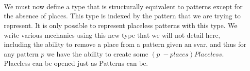 {\begin{code}
\AgdaSpace{}%
\AgdaSymbol{(}\AgdaSpace{}%
\AgdaSpace{}%
\AgdaSpace{}%
\AgdaSymbol{)}\AgdaSpace{}%
\AgdaSymbol{=}\AgdaSpace{}%
\AgdaSymbol{(}\AgdaSpace{}%
\AgdaSpace{}%
\AgdaSymbol{)}\AgdaSpace{}%
\AgdaSpace{}%
\AgdaSpace{}%
\AgdaSpace{}%
\AgdaSpace{}%
\AgdaOperator{\AgdaInductiveConstructor{[}}\AgdaSpace{}%
\AgdaSpace{}%
\AgdaOperator{\AgdaFunction{++}}\AgdaSpace{}%
\AgdaSpace{}%
\AgdaOperator{\AgdaInductiveConstructor{]}}\<%
\\
\>[0]\AgdaSpace{}%
\AgdaSpace{}%
\AgdaSymbol{(}\AgdaSpace{}%
\AgdaSpace{}%
\AgdaSymbol{)}%
\>[26]\AgdaSymbol{=}\AgdaSpace{}%
\AgdaSymbol{(}\AgdaSpace{}%
\AgdaSpace{}%
\AgdaSymbol{)}\AgdaSpace{}%
\AgdaSpace{}%
\AgdaSymbol{(}\AgdaSpace{}%
\AgdaSpace{}%
\AgdaSymbol{)}\<%
\\
\>[0]\AgdaSpace{}%
\AgdaSpace{}%
\AgdaSymbol{(}\AgdaSpace{}%
\AgdaSymbol{)}%
\>[26]\AgdaSymbol{=}\AgdaSpace{}%
\AgdaSpace{}%
\AgdaSymbol{(}\AgdaSpace{}%
\AgdaSpace{}%
\AgdaSymbol{)}\<%
\\
\>[0]\AgdaSpace{}%
\AgdaSpace{}%
\AgdaSymbol{(}\AgdaSpace{}%
\AgdaSymbol{\{}\AgdaSpace{}%
\AgdaSymbol{=}\AgdaSpace{}%
\AgdaSymbol{\}}\AgdaSpace{}%
\AgdaSpace{}%
\AgdaSymbol{)}\AgdaSpace{}%
\AgdaSymbol{=}\AgdaSpace{}%
\AgdaSymbol{(}\AgdaSpace{}%
\AgdaSpace{}%
\AgdaSymbol{)}\AgdaSpace{}%
\AgdaSpace{}%
\AgdaSpace{}%
\AgdaSpace{}%
\<%
\end{code}
}

We must now define a type that is structurally equivalent to patterns except
for the absence of places. This type is indexed by the pattern that we are
trying to represent. It is only possible to represent placeless patterns with
this type. We write various mechanics using this new type that we will not detail
here, including the ability to remove a place from a pattern given an svar, and
thus for any pattern $p$ we have the ability to create some $(p\;-places) Placeless$.
Placeless can be opened just as Patterns can be.

